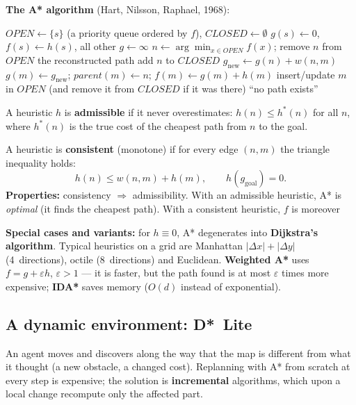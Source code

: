 \documentclass[11pt,a4paper]{article}
\theoremstyle{definition}
\providecommand{\uv}[1]{``#1''}
\begin{document}
\noindent\textbf{The A* algorithm} (Hart, Nilsson, Raphael, 1968):
\begin{algorithmic}[1]
\State $\mathit{OPEN} \gets \{s\}$ (a priority queue ordered by $f$), $\mathit{CLOSED} \gets \emptyset$
\State $g(s) \gets 0$, $f(s) \gets h(s)$, all other $g \gets \infty$
  \State $n \gets \arg\min_{x \in \mathit{OPEN}} f(x)$; remove $n$ from $\mathit{OPEN}$
   \Return the reconstructed path \EndIf
  \State add $n$ to $\mathit{CLOSED}$
    \State $g_{\mathrm{new}} \gets g(n) + w(n,m)$
      \State $g(m) \gets g_{\mathrm{new}}$; $\mathit{parent}(m) \gets n$;
             $f(m) \gets g(m) + h(m)$
      \State insert/update $m$ in $\mathit{OPEN}$ (and remove it from $\mathit{CLOSED}$ if it was there)
    \EndIf
  \EndFor
\EndWhile
\State \Return \uv{no path exists}
\end{algorithmic}

\begin{defbox}
A heuristic $h$ is \textbf{admissible} if it never overestimates:
$h(n) \le h^*(n)$ for all $n$, where $h^*(n)$ is the true cost of the cheapest path from $n$ to the
goal.

A heuristic is \textbf{consistent} (monotone) if for every edge $(n,m)$ the triangle inequality
holds:
\[
h(n) \le w(n,m) + h(m), \qquad h(g_{\mathrm{goal}}) = 0 .
\]
\textbf{Properties:} consistency $\Rightarrow$ admissibility. With an admissible heuristic, A* is
\emph{optimal} (it finds the cheapest path). With a consistent heuristic, $f$ is moreover
\end{defbox}

\textbf{Special cases and variants:} for $h \equiv 0$, A* degenerates into \textbf{Dijkstra's
algorithm}. Typical heuristics on a grid are Manhattan $|\Delta x| + |\Delta y|$ (4~directions),
octile (8~directions) and Euclidean. \textbf{Weighted A*} uses
$f = g + \varepsilon h$, $\varepsilon > 1$ --- it is faster, but the path found is at most
$\varepsilon$ times more expensive; \textbf{IDA*} saves memory ($O(d)$ instead of exponential).

\subsection{A dynamic environment: D*~Lite}

An agent moves and discovers along the way that the map is different from what it thought (a
new obstacle, a changed cost). Replanning with A* from scratch at every step is expensive; the
solution is \textbf{incremental} algorithms, which upon a local change recompute only the
affected part.
\end{document}
